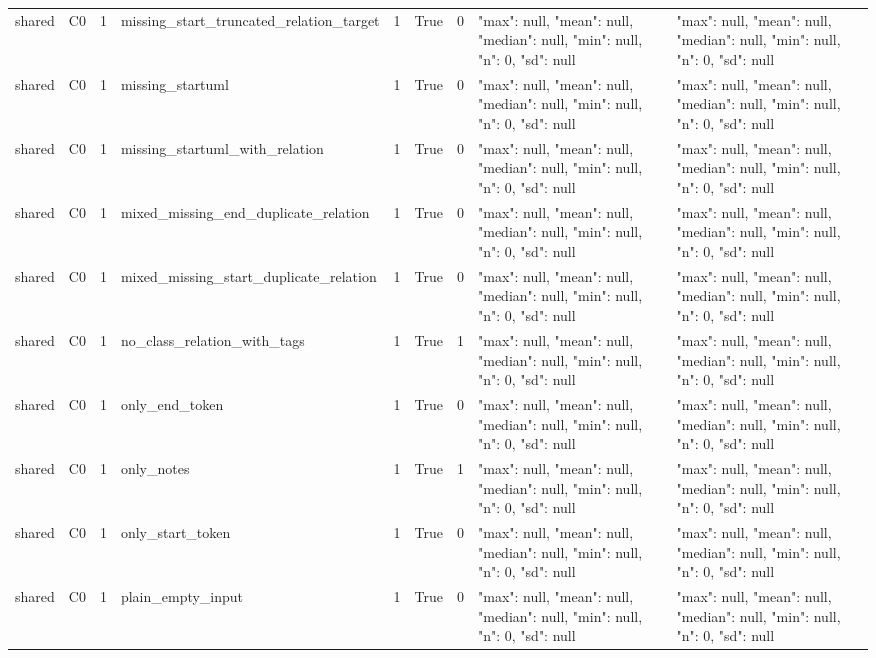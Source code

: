 \begin{tabular}{lllllllll}
shared & C0 & 1 & missing\_start\_truncated\_relation\_target & 1 & True & 0 & {"max": null, "mean": null, "median": null, "min": null, "n": 0, "sd": null} & {"max": null, "mean": null, "median": null, "min": null, "n": 0, "sd": null} \\
shared & C0 & 1 & missing\_startuml & 1 & True & 0 & {"max": null, "mean": null, "median": null, "min": null, "n": 0, "sd": null} & {"max": null, "mean": null, "median": null, "min": null, "n": 0, "sd": null} \\
shared & C0 & 1 & missing\_startuml\_with\_relation & 1 & True & 0 & {"max": null, "mean": null, "median": null, "min": null, "n": 0, "sd": null} & {"max": null, "mean": null, "median": null, "min": null, "n": 0, "sd": null} \\
shared & C0 & 1 & mixed\_missing\_end\_duplicate\_relation & 1 & True & 0 & {"max": null, "mean": null, "median": null, "min": null, "n": 0, "sd": null} & {"max": null, "mean": null, "median": null, "min": null, "n": 0, "sd": null} \\
shared & C0 & 1 & mixed\_missing\_start\_duplicate\_relation & 1 & True & 0 & {"max": null, "mean": null, "median": null, "min": null, "n": 0, "sd": null} & {"max": null, "mean": null, "median": null, "min": null, "n": 0, "sd": null} \\
shared & C0 & 1 & no\_class\_relation\_with\_tags & 1 & True & 1 & {"max": null, "mean": null, "median": null, "min": null, "n": 0, "sd": null} & {"max": null, "mean": null, "median": null, "min": null, "n": 0, "sd": null} \\
shared & C0 & 1 & only\_end\_token & 1 & True & 0 & {"max": null, "mean": null, "median": null, "min": null, "n": 0, "sd": null} & {"max": null, "mean": null, "median": null, "min": null, "n": 0, "sd": null} \\
shared & C0 & 1 & only\_notes & 1 & True & 1 & {"max": null, "mean": null, "median": null, "min": null, "n": 0, "sd": null} & {"max": null, "mean": null, "median": null, "min": null, "n": 0, "sd": null} \\
shared & C0 & 1 & only\_start\_token & 1 & True & 0 & {"max": null, "mean": null, "median": null, "min": null, "n": 0, "sd": null} & {"max": null, "mean": null, "median": null, "min": null, "n": 0, "sd": null} \\
shared & C0 & 1 & plain\_empty\_input & 1 & True & 0 & {"max": null, "mean": null, "median": null, "min": null, "n": 0, "sd": null} & {"max": null, "mean": null, "median": null, "min": null, "n": 0, "sd": null} \\

\end{tabular}
